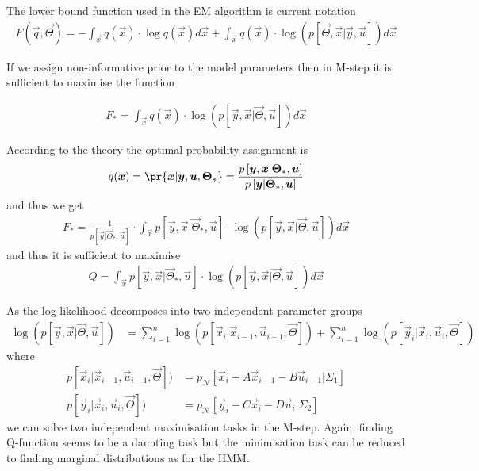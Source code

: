 \documentclass[landscape,footrule]{foils}
\newcommand{\pd}[1]{p\left[#1\right]}
\begin{document}
The lower bound function used in the EM algorithm is current notation
\begin{align*}
F(\vec{q},\vec{\Theta})= -\int_{\vec{x}}q(\vec{x})\cdot\log q(\vec{x})d\vec{x}+
 \int_{\vec{x}}q(\vec{x})\cdot\log\left(\pd{\vec{\Theta},\vec{x}|\vec{y},\vec{u}}\right)d\vec{x}
\end{align*}

If we assign non-informative prior to the model parameters then in M-step it is sufficient to maximise the function

\begin{align*}
F_*=\int_{\vec{x}}q(\vec{x})\cdot\log\left(\pd{\vec{y},\vec{x}|\vec{\Theta},\vec{u}}\right)d\vec{x}
\end{align*}  


According to the theory the optimal probability assignment is
\begin{align*}
q(\vec{x})=\pr{\vec{x}|\vec{y},\vec{u},\vec{\Theta}_*}=\frac{\pd{\vec{y},\vec{x}|\vec{\Theta}_*,\vec{u}}}{\pd{\vec{y}|\vec{\Theta}_*,\vec{u}}}
\end{align*}
and thus we get
\begin{align*}
F_*=\frac{1}{\pd{\vec{y}|\vec{\Theta}_*,\vec{u}}}\cdot\int_{\vec{x}}\pd{\vec{y},\vec{x}|\vec{\Theta}_*,\vec{u}}\cdot\log\left(\pd{\vec{y},\vec{x}|\vec{\Theta},\vec{u}}\right)d\vec{x}
\end{align*}  
and thus it is sufficient to maximise
\begin{align*}
Q=\int_{\vec{x}}\pd{\vec{y},\vec{x}|\vec{\Theta}_*,\vec{u}}\cdot\log\left(\pd{\vec{y},\vec{x}|\vec{\Theta},\vec{u}}\right)d\vec{x}
\end{align*}

\enlargethispage{1cm}
As the log-likelihood decomposes into two independent parameter groups 
\begin{align*}
\log\left(\pd{\vec{y},\vec{x}|\vec{\Theta},\vec{u}}\right)\!
&=\!\sum_{i=1}^n\log(\pd{\vec{x}_i|\vec{x}_{i-1},\vec{u}_{i-1},\vec{\Theta}})
\!+\!\sum_{i=1}^n\log(\pd{\vec{y}_i|\vec{x}_{i},\vec{u}_i,\vec{\Theta}})
\end{align*}
where
\begin{align*}
\pd{\vec{x}_i|\vec{x}_{i-1},\vec{u}_{i-1},\vec{\Theta}})&=p_\mathcal{N}[\vec{x}_i-A\vec{x}_{i-1}-B\vec{u}_{i-1}|\Sigma_1]\\
\pd{\vec{y}_i|\vec{x}_{i},\vec{u}_{i},\vec{\Theta}})&=p_\mathcal{N}[\vec{y}_i-C\vec{x}_{i}-D\vec{u}_{i}|\Sigma_2]
\end{align*}
we can solve two independent maximisation tasks in the M-step.
Again, finding Q-function seems to be a daunting task but the minimisation task can be reduced to finding marginal distributions as for the HMM.  
\end{document}
